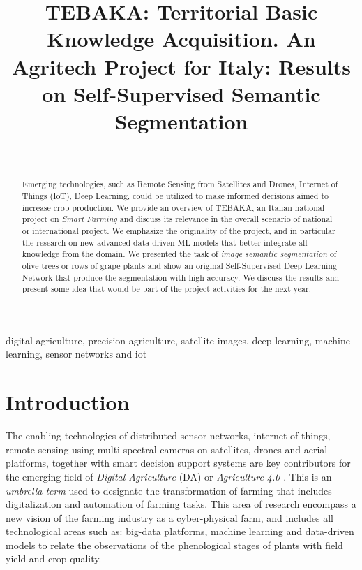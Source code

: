 \documentclass[comsoc,final]{IEEEtran}
\begin{document}

\title{\textsc{TEBAKA}: Territorial Basic Knowledge Acquisition. An Agritech Project for Italy: Results on Self-Supervised Semantic Segmentation}
\author{\\
}

\maketitle

\begin{abstract}
Emerging technologies, such as Remote Sensing from Satellites and Drones, 
Internet of Things (IoT), Deep Learning, could be utilized to make informed decisions aimed to increase crop production. We provide an overview of \textsc{TEBAKA}, an Italian national project on \emph{Smart Farming} and discuss its relevance in the overall scenario of national or international project. We emphasize the originality of the project, and in particular the research on new advanced data-driven ML models that better integrate all knowledge from the domain.
We presented the task of \emph{image semantic segmentation} of olive trees or rows of grape plants and show an original Self-Supervised Deep Learning Network that produce the segmentation with high accuracy. We discuss the results and present some idea that would be part of the 
project activities for the next year.
\end{abstract}

\begin{IEEEkeywords}
digital agriculture, precision agriculture, satellite images, deep learning, machine learning,
sensor networks and iot
\end{IEEEkeywords}


\section{Introduction}

The enabling technologies of distributed sensor networks, internet of things, remote sensing using multi-spectral cameras on satellites, drones and aerial platforms, together with smart decision support systems are key contributors for the emerging field of \emph{Digital Agriculture} (DA) or \emph{Agriculture 4.0} \cite{de2018agriculture}. 
This is an \emph{umbrella term} used to designate the transformation of farming that includes digitalization and automation of farming tasks. This area of research encompass a new vision of the farming industry as a cyber-physical farm, and includes all technological areas such as: big-data platforms, machine learning and data-driven models to relate the observations of the phenological stages of plants with field yield and crop quality. 
\end{document}
